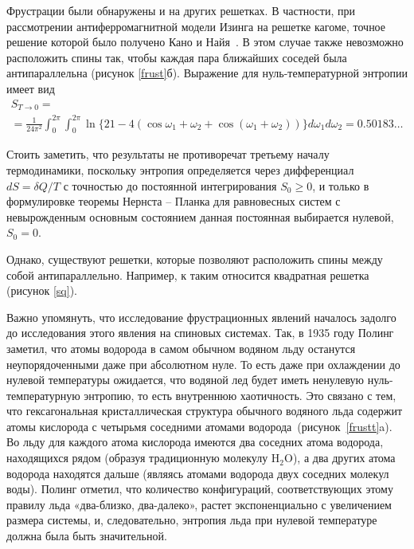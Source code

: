 Фрустрации были обнаружены и на других решетках. В частности, при рассмотрении антиферромагнитной модели Изинга на решетке кагоме, точное решение которой было получено Кано и Найя~\cite{kano_naya1953}. В этом случае также невозможно расположить спины так, чтобы каждая пара ближайших соседей была антипараллельна (рисунок \ref{frust}б). Выражение для нуль-температурной энтропии имеет вид
\begin{multline}
S_{T\rightarrow 0} = \\ = \frac{1}{24\pi^2} \int_{0}^{2\pi} \int_{0}^{2\pi} \ln \{21 - 4 (\cos \omega_1 + \omega_2 + \cos(\omega_1 + \omega_2))\} d\omega_1 d\omega_2 = 0.50183\dots
\end{multline} 

Стоить заметить, что результаты не противоречат третьему началу термодинамики, поскольку энтропия определяется через дифференциал $dS=\delta Q/T$ с точностью до постоянной интегрирования \mbox{$S_0 \geqslant 0$}, и только в формулировке теоремы Нернста – Планка для равновесных систем с невырожденным основным состоянием данная постоянная выбирается нулевой, $S_0 = 0$.


Однако, существуют решетки, которые позволяют расположить спины между собой антипараллельно. Например, к таким относится квадратная решетка~\cite{onsager1941} (рисунок \ref{sq}). 

Важно упомянуть, что исследование фрустрационных явлений началось задолго до исследования этого явления на спиновых системах. Так, в 1935 году Полинг \cite{pauling1935} заметил, что атомы водорода в самом обычном водяном льду останутся неупорядоченными даже при абсолютном нуле. То есть даже при охлаждении до нулевой температуры ожидается, что водяной лед будет иметь ненулевую нуль-температурную энтропию, то есть внутреннюю хаотичность. Это связано с тем, что гексагональная кристаллическая структура обычного водяного льда содержит атомы кислорода с четырьмя соседними атомами водорода~(рисунок~\ref{frustt}a). Во льду для каждого атома кислорода имеются два соседних атома водорода, находящихся рядом (образуя традиционную молекулу H$_2$O), а два других атома водорода находятся дальше (являясь атомами водорода двух соседних молекул воды). Полинг отметил, что количество конфигураций, соответствующих этому правилу льда «два-близко, два-далеко», растет экспоненциально с увеличением размера системы, и, следовательно, энтропия льда при нулевой температуре должна была быть значительной.

